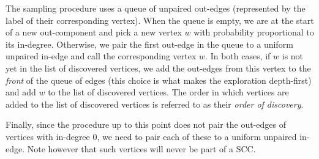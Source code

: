 The sampling procedure uses a queue of unpaired out-edges (represented by the label of their corresponding vertex). When the queue is empty, we are at the start of a new out-component and pick a new vertex $w$ with probability proportional to its in-degree. Otherwise, we pair the first out-edge in the queue to a uniform unpaired in-edge and call the corresponding vertex $w$. In both cases, if $w$ is not yet in the list of discovered vertices, we add the out-edges from this vertex to the \emph{front} of the queue of edges (this choice is what makes the exploration depth-first) and add $w$ to the list of discovered vertices. The order in which vertices are added to the list of discovered vertices is referred to as their \emph{order of discovery}. 

Finally, since the procedure up to this point does not pair the out-edges of vertices with in-degree 0, we need to pair each of these to a uniform unpaired in-edge. Note however that such vertices will never be part of a SCC.

